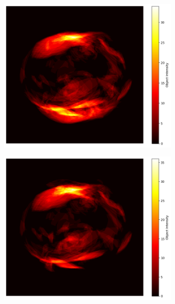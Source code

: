 \begin{figure}[h!]
    \centering %
    \begin{subfigure}{0.33\textwidth}
        \includegraphics[width=\linewidth]{Images/chapter2/fold0_heatmap.png}
        \caption{}
        \label{fig:fold0}
    \end{subfigure}\hfil %
    \begin{subfigure}{0.33\textwidth}
        \includegraphics[width=\linewidth]{Images/chapter2/fold1_heatmap.png}

\end{subfigure}
\end{figure}
